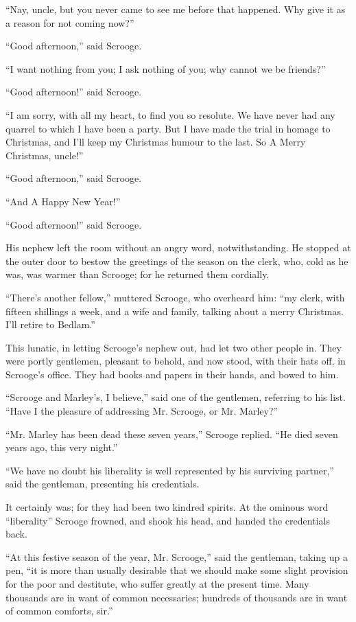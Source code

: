 \documentclass[paper=a5,BCOR=15mm,twoside,DIV=15,headinclude=off,12pt,chapterprefix=off,openany,headings=huge]{scrbook} %
\begin{document}
\enquote{Nay, uncle, but you never came to see me before that happened. Why give it as a reason for not coming now?}

\enquote{Good afternoon,} said Scrooge.

\enquote{I want nothing from you; I ask nothing of you; why cannot we be friends?}

\enquote{Good afternoon!} said Scrooge.

\enquote{I am sorry, with all my heart, to find you so resolute. We have never had any quarrel to which I have been a party. But I have made the trial in homage to Christmas, and I'll keep my Christmas humour to the last. So A Merry Christmas, uncle!}

\enquote{Good afternoon,} said Scrooge.

\enquote{And A Happy New Year!}

\enquote{Good afternoon!} said Scrooge.

His nephew left the room without an angry word, notwithstanding. He stopped at the outer door to bestow the greetings of the season on the clerk, who, cold as he was, was warmer than Scrooge; for he returned them cordially.

\enquote{There's another fellow,} muttered Scrooge, who overheard him: \enquote{my clerk, with fifteen shillings a week, and a wife and family, talking about a merry Christmas. I'll retire to Bedlam.}

This lunatic, in letting Scrooge's nephew out, had let two other people in. They were portly gentlemen, pleasant to behold, and now stood, with their hats off, in Scrooge's office. They had books and papers in their hands, and bowed to him.

\enquote{Scrooge and Marley's, I believe,} said one of the gentlemen, referring to his list. \enquote{Have I the pleasure of addressing Mr. Scrooge, or Mr. Marley?}

\enquote{Mr. Marley has been dead these seven years,} Scrooge replied. \enquote{He died seven years ago, this very night.}

\enquote{We have no doubt his liberality is well represented by his surviving partner,} said the gentleman, presenting his credentials.

It certainly was; for they had been two kindred spirits. At the ominous word \enquote{liberality} Scrooge frowned, and shook his head, and handed the credentials back.

\enquote{At this festive season of the year, Mr. Scrooge,} said the gentleman, taking up a pen, \enquote{it is more than usually desirable that we should make some slight provision for the poor and destitute, who suffer greatly at the present time. Many thousands are in want of common necessaries; hundreds of thousands are in want of common comforts, sir.}
\end{document}

